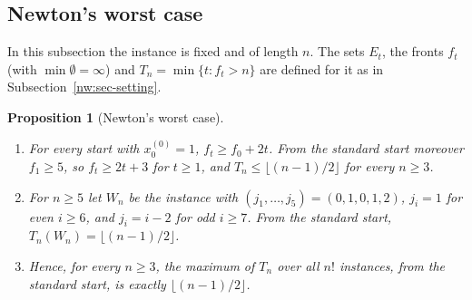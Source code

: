 \documentclass[11pt]{amsart}
\newtheorem{proposition}[theorem]{Proposition}
\theoremstyle{definition}
\theoremstyle{remark}
\begin{document}
\subsection{Newton's worst case}\label{nw:sec-worst}

In this subsection the instance is fixed and of length $n$. The sets $E_t$,
the fronts $f_t$ (with $\min\emptyset=\infty$) and $T_n=\min\{t:f_t>n\}$ are
defined for it as in Subsection~\ref{nw:sec-setting}.

\begin{proposition}[Newton's worst case]\label{nw:prop-worst}
\leavevmode
\begin{enumerate}[label=\textup{(\alph*)},leftmargin=*]
\item For every start with $x^{(0)}_0=1$, $f_t\ge f_0+2t$. From the standard
  start moreover $f_1\ge5$, so $f_t\ge2t+3$ for $t\ge1$, and
  $T_n\le\lfloor(n-1)/2\rfloor$ for every $n\ge3$.
\item For $n\ge5$ let $W_n$ be the instance with
  $(j_1,\dots,j_5)=(0,1,0,1,2)$, $j_i=1$ for even $i\ge6$, and $j_i=i-2$ for
  odd $i\ge7$. From the standard start, $T_n(W_n)=\lfloor(n-1)/2\rfloor$.
\item Hence, for every $n\ge3$, the maximum of $T_n$ over all $n!$ instances,
  from the standard start, is exactly $\lfloor(n-1)/2\rfloor$.
\end{enumerate}
\end{proposition}
\end{document}
